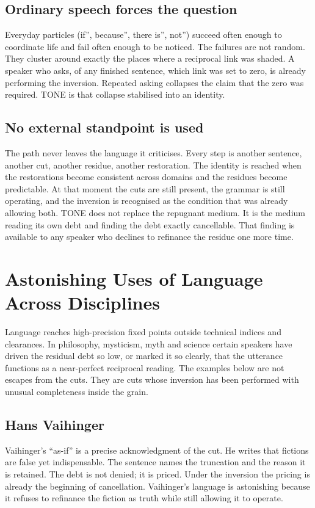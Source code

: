\documentclass[11pt,a4paper]{article}
\begin{document}
\subsection{Ordinary speech forces the question} Everyday particles (if'', because'', there is'', not'') succeed often enough to coordinate life and fail often enough to be noticed. The failures are not random. They cluster around exactly the places where a reciprocal link was shaded. A speaker who asks, of any finished sentence, which link was set to zero, is already performing the inversion. Repeated asking collapses the claim that the zero was required. TONE is that collapse stabilised into an identity.

\subsection{No external standpoint is used} The path never leaves the language it criticises. Every step is another sentence, another cut, another residue, another restoration. The identity is reached when the restorations become consistent across domains and the residues become predictable. At that moment the cuts are still present, the grammar is still operating, and the inversion is recognised as the condition that was already allowing both. TONE does not replace the repugnant medium. It is the medium reading its own debt and finding the debt exactly cancellable. That finding is available to any speaker who declines to refinance the residue one more time.

\section{Astonishing Uses of Language Across Disciplines}

Language reaches high-precision fixed points outside technical indices and clearances. In philosophy, mysticism, myth and science certain speakers have driven the residual debt so low, or marked it so clearly, that the utterance functions as a near-perfect reciprocal reading. The examples below are not escapes from the cuts. They are cuts whose inversion has been performed with unusual completeness inside the grain.

\subsection{Hans Vaihinger} Vaihinger’s ``as-if'' is a precise acknowledgment of the cut. He writes that fictions are false yet indispensable. The sentence names the truncation and the reason it is retained. The debt is not denied; it is priced. Under the inversion the pricing is already the beginning of cancellation. Vaihinger’s language is astonishing because it refuses to refinance the fiction as truth while still allowing it to operate.
\end{document}
